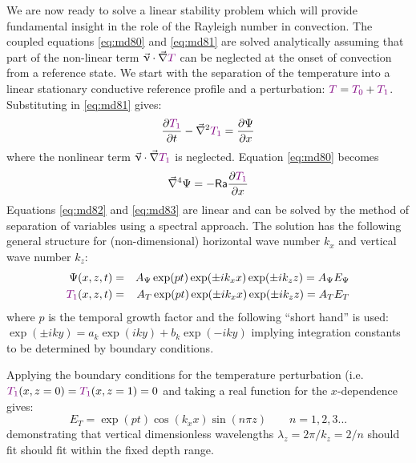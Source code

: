 We are now ready to solve a linear stability problem which will provide fundamental
insight in the role of the Rayleigh number in convection. The coupled equations \eqref{eq:md80} and
\eqref{eq:md81} are solved analytically assuming that part of the non-linear term 
$\vec\upnu\cdot \vec\nabla{\color{violet}T} $ can be
neglected at the onset of convection from a reference state.
We start with the separation of the temperature into a linear stationary conductive
reference profile and a perturbation: 
${\color{violet}T}={\color{violet}T_0}+{\color{violet}T_1}$. Substituting in \eqref{eq:md81} gives:
\begin{equation}
\frac{\partial {\color{violet} T_1}}{\partial t}  - \vec\nabla^2  {\color{violet} T_1}
= \frac{\partial \Psi}{\partial x} 
\label{eq:md82}
\end{equation}
where the nonlinear term $\vec\upnu\cdot \vec\nabla{\color{violet}T_1} $ is neglected. Equation 
\eqref{eq:md80} becomes
\begin{equation}
\vec\nabla^4 \Psi = -{\mathsf{Ra}} \frac{\partial {\color{violet}T_1}}{\partial x} 
\label{eq:md83}
\end{equation}
Equations \eqref{eq:md82} and \eqref{eq:md83} are linear and can be solved by the method of separation of
variables using a spectral approach. The solution has the following general structure for
(non-dimensional) horizontal wave number $k_x$ and vertical wave number $k_z$:
\begin{eqnarray}
\Psi(x,z,t) &=& A_\Psi \exp (pt) \exp (\pm ik_x x) \exp (\pm ik_z z) = A_\Psi E_\Psi \\
{\color{violet}T_1} (x,z,t) &=& A_T \exp (pt) \exp (\pm ik_x x) \exp (\pm ik_z z) = A_T E_T 
\end{eqnarray}
where $p$ is the temporal growth factor and the following ``short hand'' is used:
$\exp (\pm iky) = a_k \exp (iky) + b_k \exp (-iky)$ implying integration constants to be determined by boundary
conditions.

\vspace{0.5cm}
\vspace{0.5cm}

Applying the boundary conditions for the temperature perturbation 
(i.e. $ {\color{violet}T_1}(x,z=0)= {\color{violet}T_1}(x,z=1)=0$
and taking a real function for the $x$-dependence gives:
\begin{equation}
E_T = \exp (pt) \cos (k_x x) \sin (n\pi z) \qquad n=1,2,3...
\label{eq:md85}
\end{equation}
demonstrating that vertical dimensionless wavelengths
$\lambda_z = 2\pi/k_z = 2/n$ should fit should fit within the fixed depth range.

